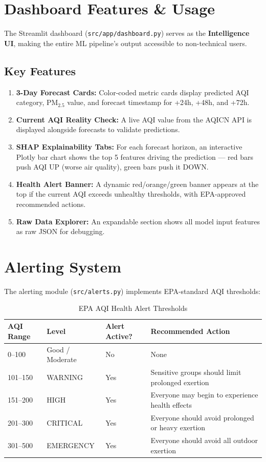 \documentclass[11pt,a4paper]{article}
\begin{document}
\section{Dashboard Features \& Usage}

The Streamlit dashboard (\texttt{src/app/dashboard.py}) serves as the \textbf{Intelligence UI}, making the entire ML pipeline's output accessible to non-technical users.

\subsection{Key Features}
\begin{enumerate}
    \item \textbf{3-Day Forecast Cards:} Color-coded metric cards display predicted AQI category, $\text{PM}_{2.5}$ value, and forecast timestamp for +24h, +48h, and +72h.
    \item \textbf{Current AQI Reality Check:} A live AQI value from the AQICN API is displayed alongside forecasts to validate predictions.
    \item \textbf{SHAP Explainability Tabs:} For each forecast horizon, an interactive Plotly bar chart shows the top 5 features driving the prediction --- red bars push AQI UP (worse air quality), green bars push it DOWN.
    \item \textbf{Health Alert Banner:} A dynamic red/orange/green banner appears at the top if the current AQI exceeds unhealthy thresholds, with EPA-approved recommended actions.
    \item \textbf{Raw Data Explorer:} An expandable section shows all model input features as raw JSON for debugging.
\end{enumerate}

\newpage
\section{Alerting System}

The alerting module (\texttt{src/alerts.py}) implements EPA-standard AQI thresholds:

\begin{table}[h!]
\centering
\small
\begin{tabularx}{\textwidth}{l l l X}
\toprule
\textbf{AQI Range} & \textbf{Level} & \textbf{Alert Active?} & \textbf{Recommended Action} \\
\midrule
0--100 & Good / Moderate & No & None \\
101--150 & WARNING & Yes & Sensitive groups should limit prolonged exertion \\
151--200 & HIGH & Yes & Everyone may begin to experience health effects \\
201--300 & CRITICAL & Yes & Everyone should avoid prolonged or heavy exertion \\
301--500 & EMERGENCY & Yes & Everyone should avoid all outdoor exertion \\
\bottomrule
\end{tabularx}
\caption{EPA AQI Health Alert Thresholds}
\label{tab:alerts}
\end{table}
\end{document}
